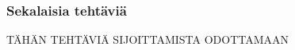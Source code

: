 \begin{tehtavasivu}
\begin{tehtava}
\begin{vastaus}
\begin{alakohdat}
\end{alakohdat}
\end{vastaus}
\end{tehtava}

\subsubsection*{Sekalaisia tehtäviä}

TÄHÄN TEHTÄVIÄ SIJOITTAMISTA ODOTTAMAAN

\end{tehtavasivu}